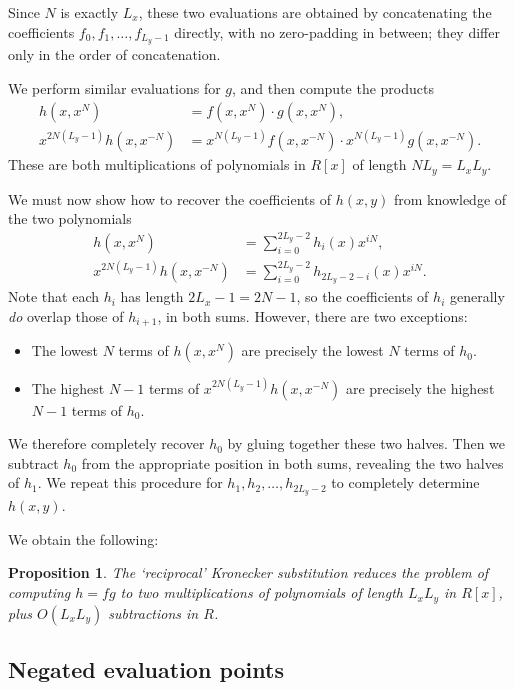 \documentclass{amsart}
\newtheorem{prop}[thm]{Proposition}
\theoremstyle{definition}
\theoremstyle{remark}
\begin{document}
Since $N$ is exactly $L_x$, these two evaluations are obtained by concatenating the coefficients $f_0, f_1, \ldots, f_{L_y - 1}$ directly, with no zero-padding in between; they differ only in the order of concatenation.

We perform similar evaluations for $g$, and then compute the products
\begin{align*}
  h(x, x^N) & = f(x, x^N) \cdot g(x, x^N), \\
 x^{2N(L_y - 1)} h(x, x^{-N}) & = x^{N(L_y - 1)} f(x, x^{-N}) \cdot x^{N(L_y - 1)} g(x, x^{-N}).
\end{align*}
These are both multiplications of polynomials in $R[x]$ of length $N L_y = L_x L_y$.

We must now show how to recover the coefficients of $h(x, y)$ from knowledge of the two polynomials
\begin{align*}
  h(x, x^N) & = \sum_{i=0}^{2L_y - 2} h_i(x) x^{iN}, \\
 x^{2N(L_y - 1)} h(x, x^{-N}) & = \sum_{i=0}^{2L_y - 2} h_{2L_y-2-i}(x) x^{iN}.
\end{align*}
Note that each $h_i$ has length $2L_x - 1 = 2N - 1$, so the coefficients of $h_i$ generally \emph{do} overlap those of $h_{i+1}$, in both sums. However, there are two exceptions:
\begin{itemize}
\item The lowest $N$ terms of $h(x, x^N)$ are precisely the lowest $N$ terms of $h_0$.
\item The highest $N - 1$ terms of $x^{2N(L_y - 1)} h(x, x^{-N})$ are precisely the highest $N - 1$ terms of $h_0$.
\end{itemize}
We therefore completely recover $h_0$ by gluing together these two halves. Then we subtract $h_0$ from the appropriate position in both sums, revealing the two halves of $h_1$. We repeat this procedure for $h_1, h_2, \ldots, h_{2L_y - 2}$ to completely determine $h(x, y)$.

We obtain the following:
\begin{prop}
\label{prop:polynomial-recip-ks}
The `reciprocal' Kronecker substitution reduces the problem of computing $h = fg$ to two multiplications of polynomials of length $L_x L_y$ in $R[x]$, plus $O(L_x L_y)$ subtractions in $R$.
\end{prop}

\subsection{Negated evaluation points}
\label{sec:polynomial-negate}
\end{document}
